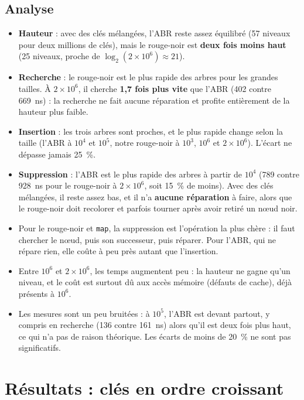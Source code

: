 \documentclass[12pt,a4paper]{report}
\begin{document}
\section{Analyse}
\begin{itemize}
  \item \textbf{Hauteur} : avec des clés mélangées, l'ABR reste assez équilibré (57 niveaux pour deux millions de clés), mais le rouge-noir est \textbf{deux fois moins haut} (25 niveaux, proche de $\log_2(2\times10^6) \approx 21$).
  \item \textbf{Recherche} : le rouge-noir est le plus rapide des arbres pour les grandes tailles. À $2\times10^6$, il cherche \textbf{1,7 fois plus vite} que l'ABR (402 contre 669~ns) : la recherche ne fait aucune réparation et profite entièrement de la hauteur plus faible.
  \item \textbf{Insertion} : les trois arbres sont proches, et le plus rapide change selon la taille (l'ABR à $10^4$ et $10^5$, notre rouge-noir à $10^3$, $10^6$ et $2\times10^6$). L'écart ne dépasse jamais 25~\%.
  \item \textbf{Suppression} : l'ABR est le plus rapide des arbres à partir de $10^4$ (789 contre 928~ns pour le rouge-noir à $2\times10^6$, soit 15~\% de moins). Avec des clés mélangées, il reste assez bas, et il n'a \textbf{aucune réparation} à faire, alors que le rouge-noir doit recolorer et parfois tourner après avoir retiré un nœud noir.
  \item Pour le rouge-noir et \texttt{map}, la suppression est l'opération la plus chère : il faut chercher le nœud, puis son successeur, puis réparer. Pour l'ABR, qui ne répare rien, elle coûte à peu près autant que l'insertion.
  \item Entre $10^6$ et $2\times10^6$, les temps augmentent peu : la hauteur ne gagne qu'un niveau, et le coût est surtout dû aux accès mémoire (défauts de cache), déjà présents à $10^6$.
  \item Les mesures sont un peu bruitées : à $10^5$, l'ABR est devant partout, y compris en recherche (136 contre 161~ns) alors qu'il est deux fois plus haut, ce qui n'a pas de raison théorique. Les écarts de moins de 20~\% ne sont pas significatifs.
\end{itemize}

\chapter{Résultats : clés en ordre croissant}
\end{document}
